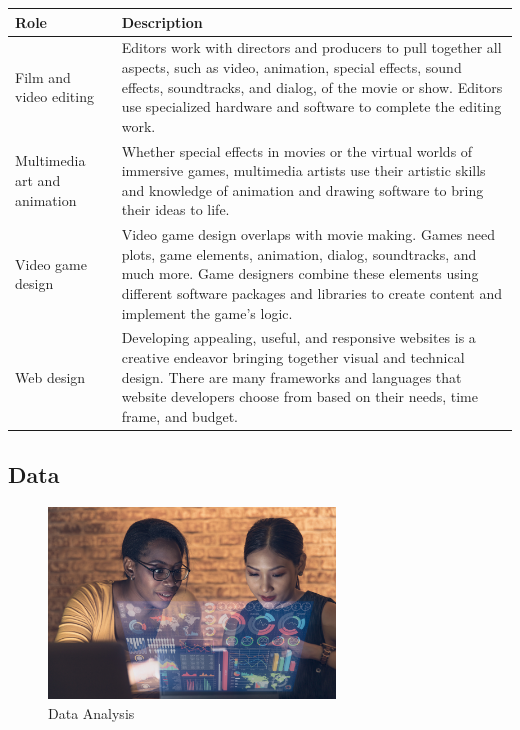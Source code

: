 \begin{table}[H]
	\begin{center}
		\begin{tabular}{p{1in}|p{3.4in}} 
			\textbf{Role} & \textbf{Description}\\
			\hline
			Film and video editing & Editors work with directors and producers to pull together all aspects, such as video, animation, special effects, sound effects, soundtracks, and dialog, of the movie or show. Editors use specialized hardware and software to complete the editing work.\\
			\hline
			Multimedia art and animation & Whether special effects in movies or the virtual worlds of immersive games, multimedia artists use their artistic skills and knowledge of animation and drawing software to bring their ideas to life.\\
			\hline
			Video game design & Video game design overlaps with movie making. Games need plots, game elements, animation, dialog, soundtracks, and much more. Game designers combine these elements using different software packages and libraries to create content and implement the game's logic.\\
			\hline
			Web design & Developing appealing, useful, and responsive websites is a creative endeavor bringing together visual and technical design. There are many frameworks and languages that website developers choose from based on their needs, time frame, and budget.\\
			\hline
		\end{tabular}
	\end{center}
\end{table}


\subsection{Data}

\begin{figure}[H]
	\begin{center}
		\caption{Data Analysis}
		\vskip 4pt
		\includegraphics[height=2in]{images/careers/iStock-1364769258.small.jpg}
	\end{center}
\end{figure}

